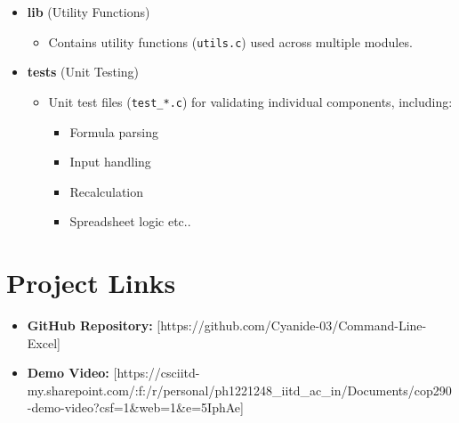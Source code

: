 \documentclass{article}
\begin{document}
\begin{itemize}
    \item \textbf{lib} (Utility Functions)
    \begin{itemize}
        \item Contains utility functions (\texttt{utils.c}) used across multiple modules.
    \end{itemize}

    \item \textbf{tests} (Unit Testing)
    \begin{itemize}
        \item Unit test files (\texttt{test\_*.c}) for validating individual components, including:
        \begin{itemize}
            \item Formula parsing
            \item Input handling
            \item Recalculation
            \item Spreadsheet logic etc..
        \end{itemize}
    \end{itemize}

\end{itemize}


\section{Project Links}
\begin{itemize}
    \item \textbf{GitHub Repository:} [https://github.com/Cyanide-03/Command-Line-Excel]
    \item \textbf{Demo Video:} [https://csciitd-my.sharepoint.com/:f:/r/personal/ph1221248_iitd_ac_in/Documents/cop290-demo-video?csf=1&web=1&e=5IphAe]
\end{itemize}
\end{document}
